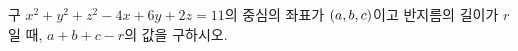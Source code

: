 구 $x^2+y^2+z^2-4x+6y+2z=11$의 중심의 좌표가 $(a{,}\mkern3mu\mathopen{}b{,}\mkern3mu\mathopen{}c)$이고 반지름의 길이가 $r$일 때, $a+b+c-r$의 값을 구하시오.
